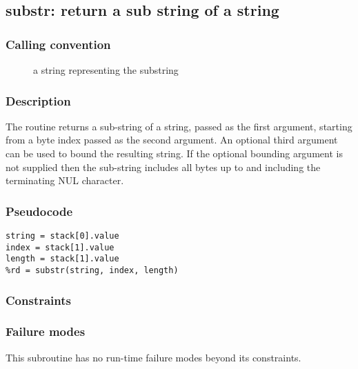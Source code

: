 \clearpage
{}
{}
\label{subr:substr}
\subsection*{substr: return a sub string of a string}

\subsubsection*{Calling convention}

\begin{description}
\item[] a string representing the substring
\end{description}

\subsubsection*{Description}

The  routine returns a sub-string of a string,
passed as the first argument, starting from a byte index passed as the
second argument.  An optional third argument can be used to bound the
resulting string.  If the optional bounding argument is not supplied
then the sub-string includes all bytes up to and including the
terminating NUL character.

\subsubsection*{Pseudocode}

\begin{verbatim}
string = stack[0].value
index = stack[1].value
length = stack[1].value
%rd = substr(string, index, length)
\end{verbatim}

\subsubsection*{Constraints}

\subsubsection*{Failure modes}

This subroutine has no run-time failure modes beyond its constraints.
